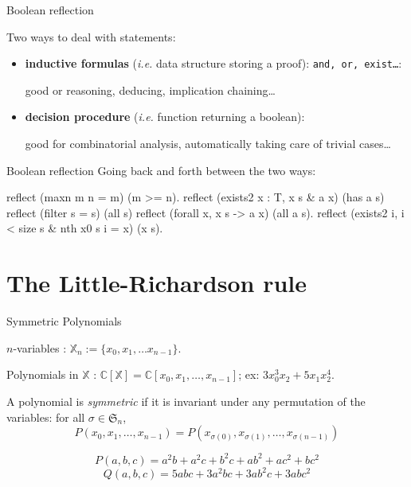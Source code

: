 \documentclass[compress,11pt]{beamer}
\newcommand{\XX}{{\mathbb X}}
\newcommand{\C}{{\mathbb C}}
\newcommand{\SG}{{\mathfrak S}}
\begin{document}
\begin{frame}[fragile]{Boolean reflection}

Two ways to deal with statements:
\begin{itemize}
\item \textbf{inductive formulas} (\textit{i.e.} data structure storing a
  proof): \texttt{and, or, exist\dots}:

  good or reasoning, deducing, implication chaining\dots

  \bigskip

\item \textbf{decision procedure} (\textit{i.e.} function returning a
  boolean):

  good for combinatorial analysis, automatically taking care of trivial cases\dots
\end{itemize}

\begin{block}{Boolean reflection}
  Going back and forth between the two ways:
\end{block}
  \begin{coqcode}
    reflect (maxn m n = m) (m >= n).
    reflect (exists2 x : T, x \in s & a x) (has a s)
    reflect (filter s = s) (all s)
    reflect (forall x, x \in s -> a x) (all a s).
    reflect (exists2 i, i < size s & nth x0 s i = x) (x \in s).
  \end{coqcode}
\end{frame}


\section{The Little-Richardson rule}

\begin{frame}{Symmetric Polynomials}
  
  $n$-variables : $\XX_n := \{x_0, x_1, \dots x_{n-1}\}$.

  Polynomials in $\XX$ : $\C[\XX] = \C[x_0, x_1, \dots, x_{n-1}]$; ex: $3x_0^3x_2
  + 5 x_1x_2^4$.

  \begin{DEFN}
    A polynomial is \emph{symmetric} if it is invariant under any permutation of the
    variables: for all $\sigma\in\SG_n$,
    \[P(x_0, x_1, \dots, x_{n-1}) = 
    P(x_{\sigma(0)}, x_{\sigma(1)}, \dots, x_{\sigma({n-1})})\]
  \end{DEFN}

  \[P(a,b,c) = a^2b + a^2c + b^2c + ab^2 + ac^2 + bc^2\]
  \[Q(a,b,c) = 5abc + 3a^2bc + 3ab^2c + 3abc^2\]

\end{frame}
\end{document}
